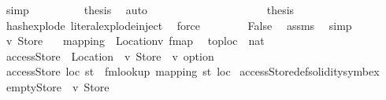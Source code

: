 \begin{isabellebody}
\ simp\isanewline
\ \ \ \ \ \ \isamarkupfalse%
\ \isamarkupfalse%
\ {\isacharquery}{\kern0pt}thesis\ \isamarkupfalse%
\ auto\isanewline
\ \ \ \ \isamarkupfalse%
\isanewline
\ \ \isamarkupfalse%
\isanewline
\ \ \ \ \isamarkupfalse%
\ {}\isanewline
\ \ \ \ \isamarkupfalse%
\ \isamarkupfalse%
\ {\isacharquery}{\kern0pt}thesis\ \isamarkupfalse%
\ hash{\isacharunderscore}{\kern0pt}explode\ literal{\isachardot}{\kern0pt}explode{\isacharunderscore}{\kern0pt}inject\ \isamarkupfalse%
\ force\isanewline
\ \ \isamarkupfalse%
\isanewline
\ \ \isamarkupfalse%
\ \isamarkupfalse%
\ False\ \isamarkupfalse%
\ assms{\isacharparenleft}{\kern0pt}{}{\isacharparenright}{\kern0pt}\ \isamarkupfalse%
\ simp\isanewline
{}\isamarkupfalse%
%
\endisatagproof
{\isafoldproof}%
%
\isadelimproof
%
\endisadelimproof
%
\isadelimdocument
%
\endisadelimdocument
%
\isatagdocument
%
\isamarkuptrue%
%
\endisatagdocument
{\isafolddocument}%
%
\isadelimdocument
%
\endisadelimdocument
{}\isamarkupfalse%
\ {\isacharprime}{\kern0pt}v\ Store\ {\isacharequal}{\kern0pt}\isanewline
\ \ mapping\ {\isacharcolon}{\kern0pt}{\isacharcolon}{\kern0pt}\ {\isachardoublequoteopen}{\isacharparenleft}{\kern0pt}Location{\isacharcomma}{\kern0pt}{\isacharprime}{\kern0pt}v{\isacharparenright}{\kern0pt}\ fmap{\isachardoublequoteclose}\isanewline
\ \ toploc\ {\isacharcolon}{\kern0pt}{\isacharcolon}{\kern0pt}\ nat\ \isanewline
\isanewline
{}\isamarkupfalse%
\ accessStore\ {\isacharcolon}{\kern0pt}{\isacharcolon}{\kern0pt}\ {\isachardoublequoteopen}Location\ {\isasymRightarrow}\ {\isacharprime}{\kern0pt}v\ Store\ {\isasymRightarrow}\ {\isacharprime}{\kern0pt}v\ option{\isachardoublequoteclose}\isanewline
{}\ {\isachardoublequoteopen}accessStore\ loc\ st\ {\isacharequal}{\kern0pt}\ fmlookup\ {\isacharparenleft}{\kern0pt}mapping\ st{\isacharparenright}{\kern0pt}\ loc{\isachardoublequoteclose}\isanewline
\isanewline
{}\isamarkupfalse%
\ accessStore{\isacharunderscore}{\kern0pt}def{\isacharbrackleft}{\kern0pt}solidity{\isacharunderscore}{\kern0pt}symbex{\isacharbrackright}{\kern0pt}\isanewline
\isanewline
{}\isamarkupfalse%
\ emptyStore\ {\isacharcolon}{\kern0pt}{\isacharcolon}{\kern0pt}\ {\isachardoublequoteopen}{\isacharprime}{\kern0pt}v\ Store{\isachardoublequoteclose}\isanewline

\end{isabellebody}
